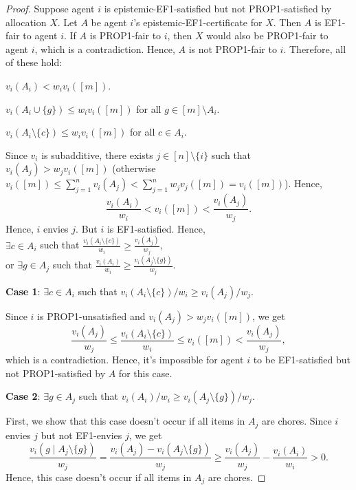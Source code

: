 \begin{proof}
Suppose agent $i$ is epistemic-EF1-satisfied but not PROP1-satisfied by allocation $X$.
Let $A$ be agent $i$'s epistemic-EF1-certificate for $X$.
Then $A$ is EF1-fair to agent $i$.
If $A$ is PROP1-fair to $i$, then $X$ would also be PROP1-fair to agent $i$,
which is a contradiction. Hence, $A$ is not PROP1-fair to $i$.
Therefore, all of these hold:
\begin{tightenum}
\item $v_i(A_i) < w_iv_i([m])$.
\item $v_i(A_i \cup \{g\}) \le w_iv_i([m])$ for all $g \in [m] \setminus A_i$.
\item $v_i(A_i \setminus \{c\}) \le w_iv_i([m])$ for all $c \in A_i$.
\end{tightenum}

Since $v_i$ is subadditive, there exists $j \in [n] \setminus \{i\}$ such that $v_i(A_j) > w_jv_i([m])$
(otherwise $v_i([m]) \le \sum_{j=1}^n v_i(A_j) < \sum_{j=1}^n w_jv_j([m]) = v_i([m])$). Hence,
\[ \frac{v_i(A_i)}{w_i} < v_i([m]) < \frac{v_i(A_j)}{w_j}. \]
Hence, $i$ envies $j$. But $i$ is EF1-satisfied. Hence,
\\ $\exists c \in A_i$ such that
    $\displaystyle \frac{v_i(A_i \setminus \{c\})}{w_i} \ge \frac{v_i(A_j)}{w_j}$,
\\ or $\exists g \in A_j$ such that
    $\displaystyle \frac{v_i(A_i)}{w_i} \ge \frac{v_i(A_j \setminus \{g\})}{w_j}$.

\textbf{Case 1}: $\exists c \in A_i$ such that $v_i(A_i \setminus \{c\})/w_i \ge v_i(A_j)/w_j$.

Since $i$ is PROP1-unsatisfied and $v_i(A_j) > w_jv_i([m])$, we get
\[ \frac{v_i(A_j)}{w_j} \le \frac{v_i(A_i \setminus \{c\})}{w_i} \le v_i([m]) < \frac{v_i(A_j)}{w_j}, \]
which is a contradiction.
Hence, it's impossible for agent $i$ to be EF1-satisfied but not PROP1-satisfied by $A$ for this case.

\textbf{Case 2}: $\exists g \in A_j$ such that $v_i(A_i)/w_i \ge v_i(A_j \setminus \{g\})/w_j$.

First, we show that this case doesn't occur if all items in $A_j$ are chores.
Since $i$ envies $j$ but not EF1-envies $j$, we get
\begin{equation}
\label{eq:impl:eef1-to-prop1:gpos}
\frac{v_i(g \mid A_j \setminus \{g\})}{w_j}
= \frac{v_i(A_j) - v_i(A_j \setminus \{g\})}{w_j}
\ge \frac{v_i(A_j)}{w_j} - \frac{v_i(A_i)}{w_i} > 0.
\end{equation}
Hence, this case doesn't occur if all items in $A_j$ are chores.


\end{proof}
